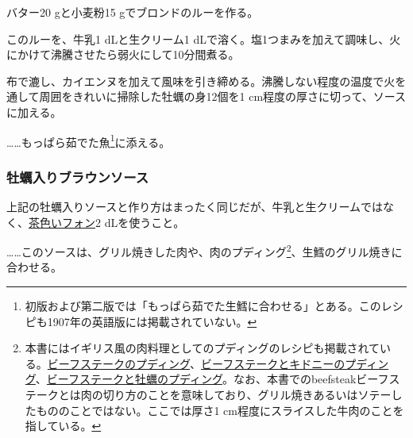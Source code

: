 \begin{recette}
バター20 gと小麦粉15 gでブロンドのルーを作る。

このルーを、牛乳1 dLと生クリーム1
dLで溶く。塩1つまみを加えて調味し、火にかけて沸騰させたら弱火にして10分間煮る。

布で漉し、カイエンヌを加えて風味を引き締める。沸騰しない程度の温度で火を通して周囲をきれいに掃除した牡蠣の身12個を1
cm程度の厚さに切って、ソースに加える。

\ldots{}\ldots{}もっぱら茹でた魚\footnote{初版および第二版では「もっぱら茹でた生鱈に合わせる」とある。このレシピも1907年の英語版には掲載されていない。}に添える。

\atoaki{}

\hypertarget{brown-oyster-sauce}{%
\subsubsection{牡蠣入りブラウンソース}\label{brown-oyster-sauce}}



上記の牡蠣入りソースと作り方はまったく同じだが、牛乳と生クリームではなく、\protect\hyperlink{fonds-brun}{茶色いフォン}2
dLを使うこと。

\ldots{}\ldots{}このソースは、グリル焼きした肉や、肉のプディング\footnote{本書にはイギリス風の肉料理としてのプディングのレシピも掲載されている。\protect\hyperlink{beefteak-pudding}{ビーフステークのプディング}、\protect\hyperlink{beefsteak-and-kidney-pudding}{ビーフステークとキドニーのプディング}、\protect\hyperlink{beefsteak-and-oysters-pudding}{ビーフステークと牡蠣のプディング}。なお、本書でのbeefsteakビーフステークとは肉の切り方のことを意味しており、グリル焼きあるいはソテーしたもののことではない。ここでは厚さ1
  cm程度にスライスした牛肉のことを指している。}、生鱈のグリル焼きに合わせる。


\end{recette}
